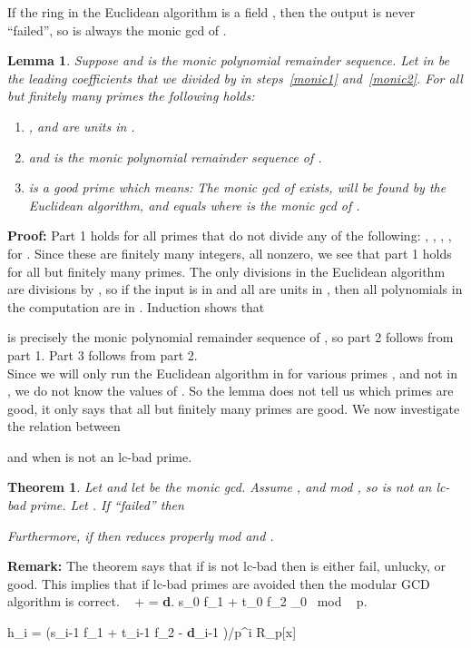 \documentclass[10pt]{article}
\newtheorem{theorem}{Theorem}
\newtheorem{lemma}{Lemma}
\newcommand{\bad}{lc-bad }
\begin{document}
If the ring  in the Euclidean algorithm is a field ,
then the output is never ``failed'', so  is
always the monic gcd of .
\begin{lemma}
\label{finitep}
Suppose  and 
is the monic polynomial remainder sequence. Let  in 
be the leading coefficients that we divided by in steps~\ref{monic1} 
and~\ref{monic2}.
For all but finitely many primes the following holds:
\begin{enumerate}
\item , and  are units in .
\item  and 
is the monic polynomial remainder sequence of .
\item  is a {\em good prime} which means:
The monic gcd of  exists, will be found
by the Euclidean algorithm, and equals  where  is the monic
gcd of .
\end{enumerate}
\end{lemma}
{\bf Proof:} Part 1 holds for all primes that
do not divide any of the following:
, , , , 
for . Since these are finitely many
integers, all nonzero, we see that part 1 holds for all but finitely
many primes.
The only divisions in the Euclidean algorithm are divisions
by , so if the input is in 
and all  are units in , then all polynomials
in the  computation are in .
Induction shows that

is precisely the monic polynomial remainder sequence of , so part 2 follows from part 1.
Part 3 follows from part 2.
\\

Since we will only run the Euclidean algorithm in
 for various primes , and not in ,
we do not know the values of .
So the lemma does not tell us which primes are good, it only
says that all but finitely many primes are good.
We now investigate the relation between

and  when  is not an \bad prime.
\begin{theorem}
\label{theorem1}
Let  and let  be the monic gcd.
Assume , 
and  mod , so  is not an \bad prime.
Let .
If  ``failed'' then

Furthermore, if  then 
reduces properly mod  and .
\end{theorem}
{\bf Remark:} The theorem says that if  is not \bad
then  is either fail, unlucky, or good.
This implies that if \bad primes are avoided then the modular GCD algorithm
is correct. \    +   = {\bf d}.  
	s_0 f_1 + t_0 f_2 _0 {\rm \ mod \ } p.

  h_i =
	(s_{i-1} f_1 + t_{i-1} f_2 - {\bf d}_{i-1} )/p^i \in R_p[x]
\end{document}
